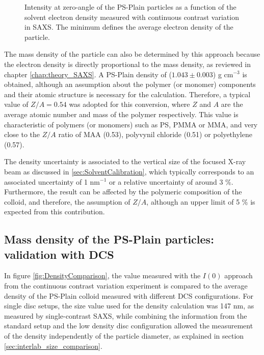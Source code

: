 \begin{figure}
	\begin{center}
		
	\end{center}
	\caption[Zero-angle intensity of the PS-Plain particles.]{Intensity at zero-angle of the PS-Plain particles as a function of the solvent electron density measured with continuous contrast variation in SAXS. The minimum defines the average electron density of the particle.}
	\label{fig:PSPlainAverageDensity}
\end{figure}

The mass density of the particle can also be determined by this approach because the electron density is directly proportional to the mass density, as reviewed in chapter \ref{chap:theory_SAXS}. A PS-Plain density of ($1.043\pm0.003$) g cm$^{-3}$ is obtained, although an assumption about the polymer (or monomer) components and their atomic structure is necessary for the calculation. Therefore, a typical value of $Z/A=0.54$ was adopted for this conversion, where $Z$ and $A$ are the average atomic number and mass of the polymer respectively. This value is characteristic of polymers (or monomers) such as PS, PMMA or MMA, and very close to the $Z/A$ ratio of MAA (0.53), polyvynil chloride (0.51) or polyethylene (0.57).

The density uncertainty is associated to the vertical size of the focused X-ray beam as discussed in \ref{sec:SolventCalibration}, which typically corresponds to an associated uncertainty of 1 nm$^{-1}$ or a relative uncertainty of around 3 $\%$. Furthermore, the result can be affected by the polymeric composition of the colloid, and therefore, the assumption of $Z/A$, although an upper limit of 5 $\%$ is expected from this contribution.

\subsection{Mass density of the PS-Plain particles: validation with DCS}

In figure \ref{fig:DensityComparison}, the value measured with the $I(0)$ approach from the continuous contrast variation experiment is compared to the average density of the PS-Plain colloid measured with different DCS configurations. For single disc setups, the size value used for the density calculation was 147 nm, as measured by single-contrast SAXS, while combining the information from the standard setup and the low density disc configuration allowed the measurement of the density independently of the particle diameter, as explained in section \ref{sec:interlab_size_comparison}.


